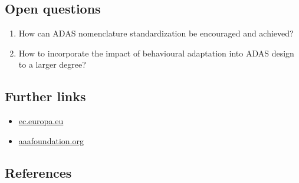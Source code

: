 \documentclass[
]{book}
\providecommand{\tightlist}{%
  \setlength{\itemsep}{0pt}\setlength{\parskip}{0pt}}
\begin{document}
\hypertarget{open-questions-23}{%
\subsection*{Open questions}\label{open-questions-23}}

\begin{enumerate}
\def\labelenumi{\arabic{enumi}.}
\tightlist
\item
  How can ADAS nomenclature standardization be encouraged and achieved?
\item
  How to incorporate the impact of behavioural adaptation into ADAS design to a larger degree?
\end{enumerate}

\hypertarget{further-links-21}{%
\subsection{Further links}\label{further-links-21}}

\begin{itemize}
\tightlist
\item
  \href{https://ec.europa.eu/transport/road_safety/sites/default/files/pdf/ersosynthesis2018-adas.pdf}{ec.europa.eu}
\item
  \href{https://aaafoundation.org/wp-content/uploads/2017/12/BehavioralAdaptationADAS.pdf}{aaafoundation.org}
\end{itemize}

\hypertarget{references-23}{%
\subsection*{References}\label{references-23}}
\end{document}
